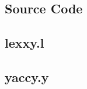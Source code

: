 \documentclass[]{article}
\begin{document}
\newpage
\begin{center}
	\section*{Source Code}
\end{center}

\subsection*{lexxy.l}
\pagebreak{}
\subsection*{yaccy.y}
\pagebreak{}


\setlength{}
\printbibliography[title={References}]

\end{document}
